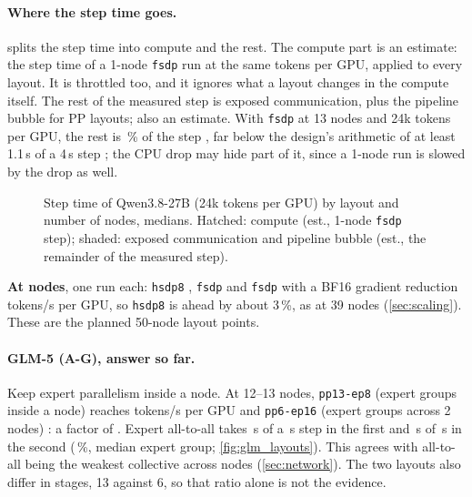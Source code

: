 \paragraph{Where the step time goes.}  splits the step time into compute and the rest. The compute part is an estimate: the step time of a 1-node \texttt{fsdp} run at the same tokens per GPU, applied to every layout. It is throttled too, and it ignores what a layout changes in the compute itself. The rest of the measured step is exposed communication, plus the pipeline bubble for PP layouts; also an estimate. With \texttt{fsdp} at 13 nodes and 24k tokens per GPU, the rest is \TriQwenFsdpCommPct\,\% of the step \est{}, far below the design's arithmetic of at least 1.1\,s of a 4\,s step \est{}; the CPU drop may hide part of it, since a 1-node run is slowed by the drop as well.

\begin{figure}[h]
  \centering{}
  \caption{Step time of Qwen3.8-27B (24k tokens per GPU) by layout and number of nodes, medians. Hatched: compute (est., 1-node \texttt{fsdp} step); shaded: exposed communication and pipeline bubble (est., the remainder of the measured step). }
  \label{fig:step_decomposition}
\end{figure}

\textbf{At \TriLevReduceTopNodes{} nodes}, one run each: \texttt{hsdp8} \TriWeakHTopTok, \texttt{fsdp} \TriWeakFTopTok{} and \texttt{fsdp} with a BF16 gradient reduction \TriTokReduceTop{} tokens/s per GPU, so \texttt{hsdp8} is ahead by about 3\,\%, as at 39 nodes (\cref{sec:scaling}). These are the planned 50-node layout points.

\paragraph{GLM-5 (A-G), answer so far.} Keep expert parallelism inside a node. At 12--13 nodes, \texttt{pp13-ep8} (expert groups inside a node) reaches \TriGlmThirteenTok{} tokens/s per GPU and \texttt{pp6-ep16} (expert groups across 2 nodes) \TriGlmSixTok: a factor of \TriGlmEpRatio. Expert all-to-all takes \TriGlmThirteenAtoa\,s of a \TriGlmThirteenStep\,s step in the first and \TriGlmSixAtoa\,s of \TriGlmSixStep\,s in the second (\TriGlmSixAtoaPct\,\%, median expert group; \cref{fig:glm_layouts}). This agrees with all-to-all being the weakest collective across nodes (\cref{sec:network}). The two layouts also differ in stages, 13 against 6, so that ratio alone is not the evidence.

